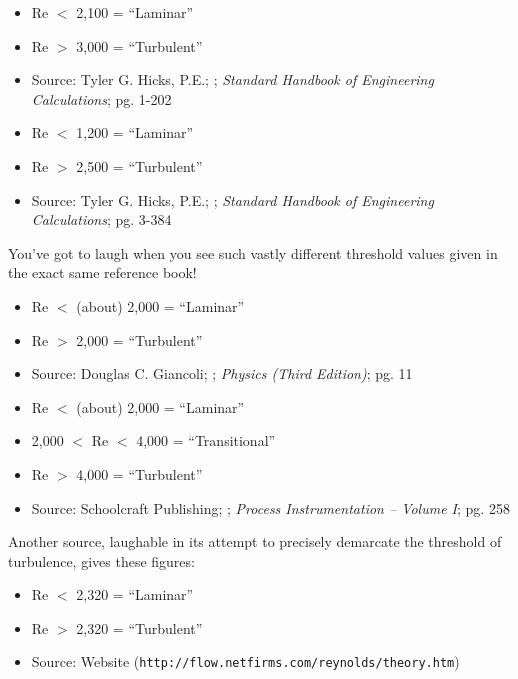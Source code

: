 \documentclass[12pt,a4paper]{article}
\begin{document}
\begin{itemize}
\goodbreak
\item{} Re $<$ 2,100 = ``Laminar''
\item{} Re $>$ 3,000 = ``Turbulent''
\item{} Source: Tyler G. Hicks, P.E.; ; {\it Standard Handbook of Engineering Calculations}; pg. 1-202
\end{itemize}

\begin{itemize}
\goodbreak
\item{} Re $<$ 1,200 = ``Laminar''
\item{} Re $>$ 2,500 = ``Turbulent''
\item{} Source: Tyler G. Hicks, P.E.; ; {\it Standard Handbook of Engineering Calculations}; pg. 3-384
\end{itemize}

You've got to laugh when you see such vastly different threshold values given in the exact same reference book!

\begin{itemize}
\goodbreak
\item{} Re $<$ (about) 2,000 = ``Laminar''
\item{} Re $>$ 2,000 = ``Turbulent''
\item{} Source: Douglas C. Giancoli; ; {\it Physics (Third Edition)}; pg. 11
\end{itemize}

\begin{itemize}
\goodbreak
\item{} Re $<$ (about) 2,000 = ``Laminar''
\item{} 2,000 $<$ Re $<$ 4,000 = ``Transitional''
\item{} Re $>$ 4,000 = ``Turbulent''
\item{} Source: Schoolcraft Publishing; ; {\it Process Instrumentation -- Volume I}; pg. 258
\end{itemize}

\goodbreak

Another source, laughable in its attempt to precisely demarcate the threshold of turbulence, gives these figures:

\begin{itemize}
\item{} Re $<$ 2,320 = ``Laminar''
\item{} Re $>$ 2,320 = ``Turbulent''
\item{} Source: Website ({\tt http://flow.netfirms.com/reynolds/theory.htm})
\end{itemize}
\end{document}
